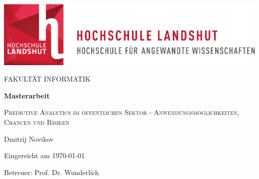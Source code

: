 \thispagestyle{empty}
\begin{titlepage}
	\vspace{3cm}



\begin{center}
	\includegraphics[scale=0.8]{Grafiken/hl-logo.pdf}  
\end{center}

\vspace{2.5cm}

\begin{center}
  \Large FAKULTÄT INFORMATIK
\end{center}

\vspace{1cm}
\begin{center}
	\Huge
	\textbf{Masterarbeit}\\
\end{center}

\vspace{1cm}

\begin{center}
	\Large
	\textsc{Predictive Analytics im öffentlichen Sektor - Anwendungsmöglichkeiten,
    Chancen und Risiken}\\
\end{center}

\vspace{1.5cm}

\begin{center}
	\Large
	Dmitrij Novikov
\end{center}

\vspace{2cm}
\begin{center}


	\large
Eingereicht am \today
\end{center}

\vspace{2cm}
\begin{center}
	\large
	Betreuer: Prof. Dr. Wunderlich
\end{center}

\end{titlepage}
